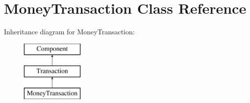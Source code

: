 \hypertarget{classMoneyTransaction}{}\section{Money\+Transaction Class Reference}
\label{classMoneyTransaction}
Inheritance diagram for Money\+Transaction\+:\begin{figure}[H]
\begin{center}
\leavevmode
\includegraphics[height=3.000000cm]{classMoneyTransaction}
\end{center}
\end{figure}
